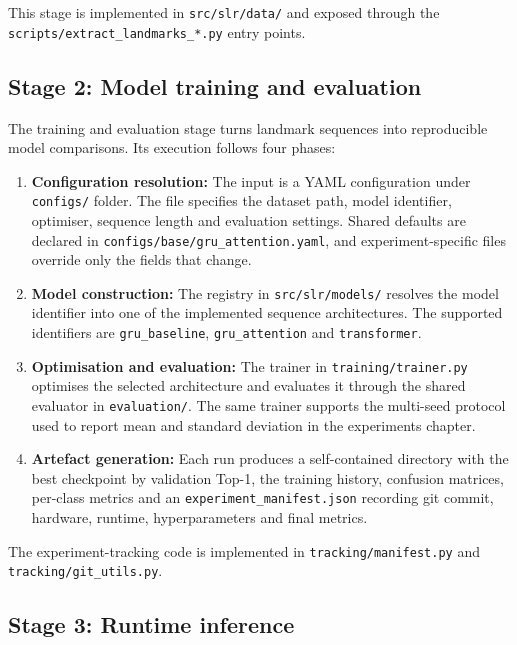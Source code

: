 This stage is implemented in \texttt{src/slr/data/} and exposed through the
\texttt{scripts/extract\_landmarks\_*.py} entry points.

\subsection{Stage 2: Model training and evaluation}
\label{subsec:model_training_evaluation}

The training and evaluation stage turns landmark sequences into reproducible model comparisons. Its
execution follows four phases:

\begin{enumerate}
    \item \textbf{Configuration resolution:} The input is a YAML configuration under
          \texttt{configs/} folder. The file specifies the dataset path, model identifier, optimiser,
          sequence length and evaluation settings. Shared defaults are declared in
          \texttt{configs/base/gru\_attention.yaml}, and experiment-specific files override only
          the fields that change.
    \item \textbf{Model construction:} The registry in \texttt{src/slr/models/} resolves the model
          identifier into one of the implemented sequence architectures. The supported identifiers
          are \texttt{gru\_baseline}, \texttt{gru\_attention} and \texttt{transformer}.
    \item \textbf{Optimisation and evaluation:} The trainer in \texttt{training/trainer.py}
          optimises the selected architecture and evaluates it through the shared evaluator in
          \texttt{evaluation/}. The same trainer supports the multi-seed protocol used to report
          mean and standard deviation in the experiments chapter.
    \item \textbf{Artefact generation:} Each run produces a self-contained directory with the best
          checkpoint by validation Top-1, the training history, confusion matrices, per-class
          metrics and an \texttt{experiment\_manifest.json} recording git commit, hardware,
          runtime, hyperparameters and final metrics.
\end{enumerate}

The experiment-tracking code is implemented in \texttt{tracking/manifest.py} and
\texttt{tracking/git\_utils.py}.

\subsection{Stage 3: Runtime inference}
\label{subsec:runtime_inference}

